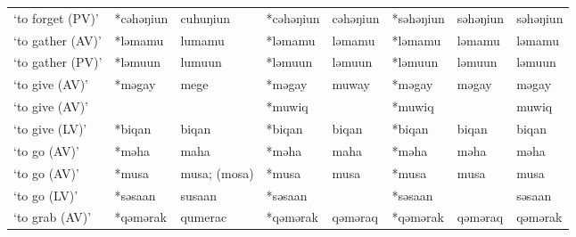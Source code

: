 \begin{landscape}
\begin{longtable}[c]{@{}p{3cm}<{\raggedright}p{2.75cm}<{\raggedright}p{2.75cm}<{\raggedright}p{2.75cm}<{\raggedright}p{2.75cm}<{\raggedright}p{2.75cm}<{\raggedright}p{2.75cm}<{\raggedright}p{2.75cm}<{\raggedright}@{}}
`to forget (PV)'                                     & *cəhəŋiun    & cuhuŋiun                      & *cəhəŋiun      & cəhəŋiun                   & *səhəŋiun        & səhəŋiun                 & səhəŋiun                          \\
`to gather (AV)'                                     & *ləmamu      & lumamu                        & *ləmamu        & ləmamu                     & *ləmamu          & ləmamu                   & ləmamu                            \\
`to gather (PV)'                                     & *ləmuun      & lumuun                        & *ləmuun        & ləmuun                     & *ləmuun          & ləmuun                   & ləmuun                            \\
`to give (AV)'                                       & *məgay       & mege                          & *məgay         & muway                      & *məgay           & məgay                    & məgay                             \\
`to give (AV)'                                       &              &                               & *muwiq         &                            & *muwiq           &                          & muwiq                             \\
`to give (LV)'                                       & *biqan       & biqan                         & *biqan         & biqan                      & *biqan           & biqan                    & biqan                             \\
`to go (AV)'                                         & *məha        & maha                          & *məha          & maha                       & *məha            & məha                     & məha                              \\
`to go (AV)'                                         & *musa        & musa; (mosa)                  & *musa          & musa                       & *musa            & musa                     & musa                              \\
`to go (LV)'                                         & *səsaan      & susaan                        & *səsaan        &                            & *səsaan          &                          & səsaan                            \\
`to grab (AV)'                                       & *qəmərak     & qumerac                       & *qəmərak       & qəməraq                    & *qəmərak         & qəməraq                  & qəmərak                           \\

\end{longtable}
\end{landscape}
